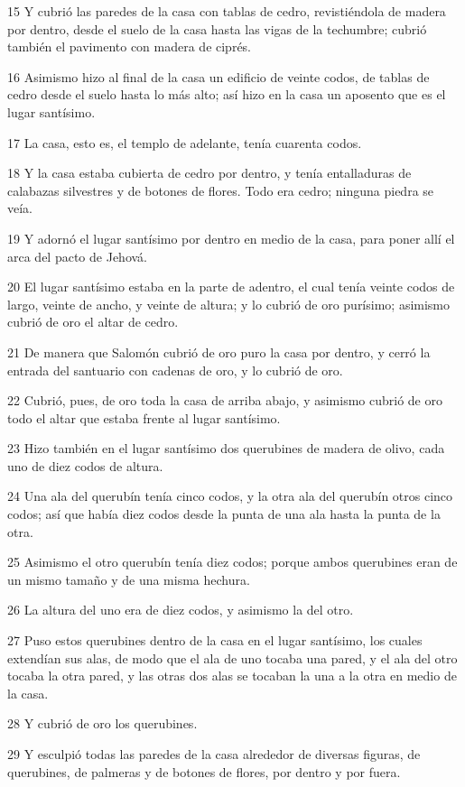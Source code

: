 \par 15 Y cubrió las paredes de la casa con tablas de cedro, revistiéndola de madera por dentro, desde el suelo de la casa hasta las vigas de la techumbre; cubrió también el pavimento con madera de ciprés.
\par 16 Asimismo hizo al final de la casa un edificio de veinte codos,  de tablas de cedro desde el suelo hasta lo más alto; así hizo en la casa un aposento que es el lugar santísimo. 
\par 17 La casa, esto es, el templo de adelante, tenía cuarenta codos.
\par 18 Y la casa estaba cubierta de cedro por dentro, y tenía entalladuras de calabazas silvestres y de botones de flores. Todo era cedro; ninguna piedra se veía.
\par 19 Y adornó el lugar santísimo por dentro en medio de la casa, para poner allí el arca del pacto de Jehová.
\par 20 El lugar santísimo estaba en la parte de adentro, el cual tenía veinte codos   de largo, veinte de ancho, y veinte de altura; y lo cubrió de oro purísimo; asimismo cubrió de oro el altar de cedro.
\par 21 De manera que Salomón cubrió de oro puro la casa por dentro, y cerró la entrada del santuario con cadenas de oro, y lo cubrió de oro.
\par 22 Cubrió, pues, de oro toda la casa de arriba abajo, y asimismo cubrió de oro todo el altar que estaba frente al lugar santísimo. 
\par 23 Hizo también en el lugar santísimo dos querubines de madera de olivo, cada uno de diez codos de altura.
\par 24 Una ala del querubín tenía cinco codos,  y la otra ala del querubín otros cinco codos; así que había diez codos desde la punta de una ala hasta la punta de la otra.
\par 25 Asimismo el otro querubín tenía diez codos;  porque ambos querubines eran de un mismo tamaño y de una misma hechura.
\par 26 La altura del uno era de diez codos,  y asimismo la del otro.
\par 27 Puso estos querubines dentro de la casa en el lugar santísimo, los cuales extendían sus alas, de modo que el ala de uno tocaba una pared, y el ala del otro tocaba la otra pared, y las otras dos alas se tocaban la una a la otra en medio de la casa.
\par 28 Y cubrió de oro los querubines.
\par 29 Y esculpió todas las paredes de la casa alrededor de diversas figuras, de querubines, de palmeras y de botones de flores, por dentro y por fuera.
